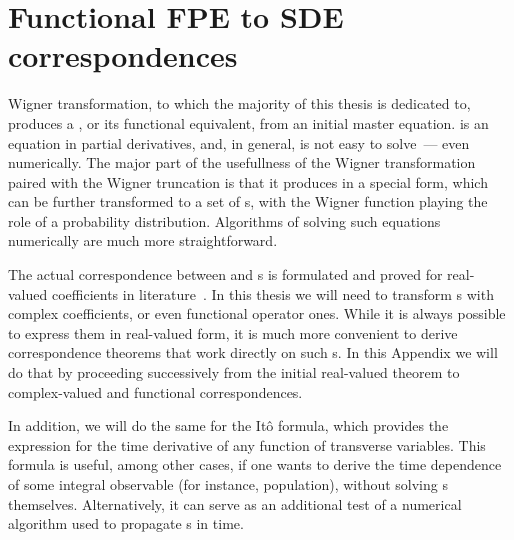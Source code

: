 \chapter{Functional FPE to SDE correspondences}
\label{cha:appendix:fpe-sde}

Wigner transformation, to which the majority of this thesis is dedicated to, produces a , or its functional equivalent, from an initial master equation.
 is an equation in partial derivatives, and, in general, is not easy to solve~--- even numerically.
The major part of the usefullness of the Wigner transformation paired with the Wigner truncation is that it produces  in a special form, which can be further transformed to a set of s, with the Wigner function playing the role of a probability distribution.
Algorithms of solving such equations numerically are much more straightforward.

The actual correspondence between  and s is formulated and proved for real-valued coefficients in literature~\cite{Risken1996}.
In this thesis we will need to transform s with complex coefficients, or even functional operator ones.
While it is always possible to express them in real-valued form, it is much more convenient to derive correspondence theorems that work directly on such s.
In this Appendix we will do that by proceeding successively from the initial real-valued theorem to complex-valued and functional correspondences.

In addition, we will do the same for the It\^o formula, which provides the expression for the time derivative of any function of transverse variables.
This formula is useful, among other cases, if one wants to derive the time dependence of some integral observable (for instance, population), without solving s themselves.
Alternatively, it can serve as an additional test of a numerical algorithm used to propagate s in time.



